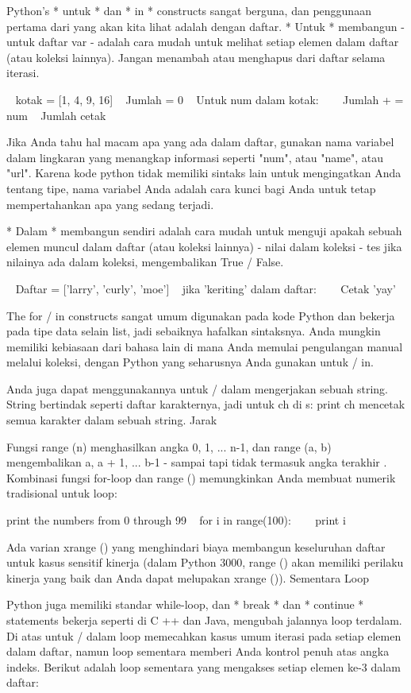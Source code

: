 Python's * untuk * dan * in * constructs sangat berguna, dan penggunaan pertama dari yang akan kita lihat adalah dengan daftar. * Untuk * membangun - untuk daftar var - adalah cara mudah untuk melihat setiap elemen dalam daftar (atau koleksi lainnya). Jangan menambah atau menghapus dari daftar selama iterasi. 

~ kotak = [1, 4, 9, 16] 
~ Jumlah = 0 
~ Untuk num dalam kotak: 
~~~ Jumlah + = num 
~ Jumlah cetak 

Jika Anda tahu hal macam apa yang ada dalam daftar, gunakan nama variabel dalam lingkaran yang menangkap informasi seperti "num", atau "name", atau "url". Karena kode python tidak memiliki sintaks lain untuk mengingatkan Anda tentang tipe, nama variabel Anda adalah cara kunci bagi Anda untuk tetap mempertahankan apa yang sedang terjadi. 

* Dalam * membangun sendiri adalah cara mudah untuk menguji apakah sebuah elemen muncul dalam daftar (atau koleksi lainnya) - nilai dalam koleksi - tes jika nilainya ada dalam koleksi, mengembalikan True / False. 

~ Daftar = ['larry', 'curly', 'moe'] 
~ jika 'keriting' dalam daftar: 
~~~ Cetak 'yay' 

The for / in constructs sangat umum digunakan pada kode Python dan bekerja pada tipe data selain list, jadi sebaiknya hafalkan sintaksnya. Anda mungkin memiliki kebiasaan dari bahasa lain di mana Anda memulai pengulangan manual melalui koleksi, dengan Python yang seharusnya Anda gunakan untuk / in. 

Anda juga dapat menggunakannya untuk / dalam mengerjakan sebuah string. String bertindak seperti daftar karakternya, jadi untuk ch di s: print ch mencetak semua karakter dalam sebuah string. 
Jarak 

Fungsi range (n) menghasilkan angka 0, 1, ... n-1, dan range (a, b) mengembalikan a, a + 1, ... b-1 - sampai tapi tidak termasuk angka terakhir . Kombinasi fungsi for-loop dan range () memungkinkan Anda membuat numerik tradisional untuk loop: 


           print the numbers from 0 through 99 
~ for i in range(100): 
~~~ print i 

Ada varian xrange () yang menghindari biaya membangun keseluruhan daftar untuk kasus sensitif kinerja (dalam Python 3000, range () akan memiliki perilaku kinerja yang baik dan Anda dapat melupakan xrange ()). 
Sementara Loop 

Python juga memiliki standar while-loop, dan * break * dan * continue * statements bekerja seperti di C ++ dan Java, mengubah jalannya loop terdalam. Di atas untuk / dalam loop memecahkan kasus umum iterasi pada setiap elemen dalam daftar, namun loop sementara memberi Anda kontrol penuh atas angka indeks. Berikut adalah loop sementara yang mengakses setiap elemen ke-3 dalam daftar: 

